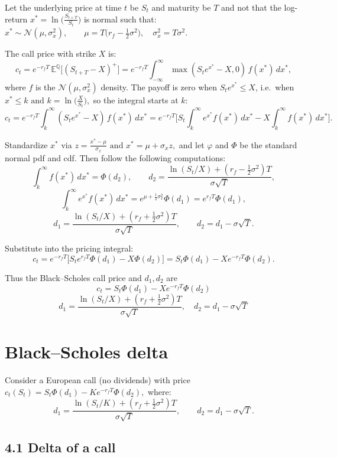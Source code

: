 Let the underlying price at time $t$ be $S_t$ and maturity be $T$ and not that the log-return
$
x^*=\ln\!\Big(\frac{S_{t+T}}{S_t}\Big)
$
is normal such that:
$
x^*\sim \mathcal{N}(\mu,\sigma_x^2),\qquad
\mu=T\Big(r_f-\tfrac{1}{2}\sigma^2\Big),\quad
\sigma_x^2=T\sigma^2.
$

The call price with strike $X$ is:
\[
c_t=e^{-r_fT}\,\mathbb{E}^{\mathbb{Q}}\!\big[(S_{t+T}-X)^+\big]
     =e^{-r_fT}\int_{-\infty}^{\infty}\max(S_t e^{x^*}-X,0)\,f(x^*)\,dx^*,
\]
where $f$ is the $\mathcal{N}(\mu,\sigma_x^2)$ density. The payoff is zero when $S_t e^{x^*}\le X$, i.e.\ when
$
x^*\le k \text{ and } k=\ln\!\Big(\frac{X}{S_t}\Big),
$
so the integral starts at $k$:
\[
c_t=e^{-r_fT}\int_{k}^{\infty}(S_t e^{x^*}-X)\,f(x^*)\,dx^*
   =e^{-r_fT}\Big[
     S_t\int_{k}^{\infty}e^{x^*}f(x^*)\,dx^*
    -X\int_{k}^{\infty}f(x^*)\,dx^*
   \Big].
\]

Standardize $x^*$ via
$
z=\frac{x^*-\mu}{\sigma_x} \text{ and } x^*=\mu+\sigma_x z,
$
and let $\varphi$ and $\Phi$ be the standard normal pdf and cdf. Then follow the following computations:
\[
\int_{k}^{\infty}f(x^*)\,dx^*=\Phi(d_2),
\qquad
d_2=\frac{\ln(S_t/X)+(r_f-\tfrac{1}{2}\sigma^2)T}{\sigma\sqrt{T}},
\]
\[
\int_{k}^{\infty}e^{x^*}f(x^*)\,dx^*
=e^{\mu+\tfrac{1}{2}\sigma_x^2}\Phi(d_1)
=e^{r_fT}\Phi(d_1),
\]
\[
d_1=\frac{\ln(S_t/X)+(r_f+\tfrac{1}{2}\sigma^2)T}{\sigma\sqrt{T}},
\qquad d_2=d_1-\sigma\sqrt{T}.
\]

Substitute into the pricing integral:
\[
c_t=e^{-r_fT}\Big[S_t e^{r_fT}\Phi(d_1)-X\Phi(d_2)\Big]
    =S_t\Phi(d_1)-X e^{-r_fT}\Phi(d_2).
\]

Thus the Black--Scholes call price and $d_1,d_2$ are
\[
\boxed{c_t=S_t\Phi(d_1)-X e^{-r_fT}\Phi(d_2)}
\]
\[
\boxed{
d_1=\frac{\ln(S_t/X)+(r_f+\tfrac{1}{2}\sigma^2)T}{\sigma\sqrt{T}},
\quad
d_2=d_1-\sigma\sqrt{T}
}
\]

\section{Black--Scholes delta}

Consider a European call (no dividends) with price
$
c_t(S_t)=S_t\Phi(d_1)-K e^{-r_f T}\Phi(d_2),
$
where:
\[
d_1=\frac{\ln(S_t/K)+(r_f+\tfrac{1}{2}\sigma^2)T}{\sigma\sqrt{T}},\qquad
d_2=d_1-\sigma\sqrt{T}.
\]

\subsection*{4.1 \quad Delta of a call}

